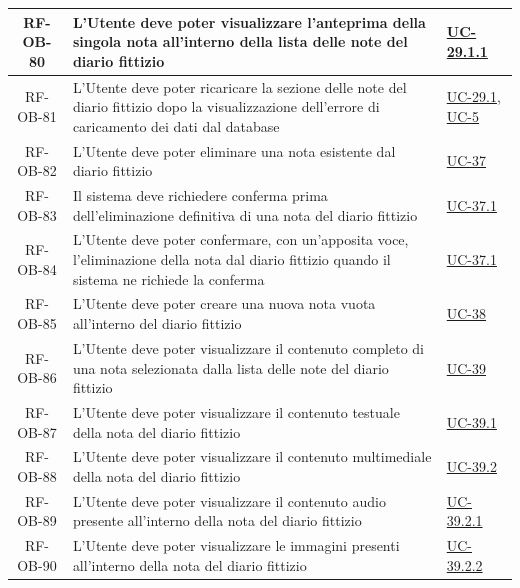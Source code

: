 \documentclass[a4paper,12pt]{article}
\begin{document}
\begin{center}
\begin{longtable}{|c|p{8.5cm}|>{\centering\arraybackslash}p{4cm}|}
RF-OB-80 & L'Utente deve poter visualizzare l'anteprima della singola nota all'interno della lista delle note del diario fittizio & \hyperref[subsec:UC-29.1.1]{UC-29.1.1} \\
\hline

RF-OB-81 & L'Utente deve poter ricaricare la sezione delle note del diario fittizio dopo la visualizzazione dell'errore di caricamento dei dati dal database & \hyperref[subsec:UC-29.1]{UC-29.1}, \hyperref[sec:UC-5]{UC-5} \\
\hline

RF-OB-82 & L'Utente deve poter eliminare una nota esistente dal diario fittizio & \hyperref[subsec:UC-37]{UC-37} \\
\hline

RF-OB-83 & Il sistema deve richiedere conferma prima dell'eliminazione definitiva di una nota del diario fittizio & \hyperref[subsec:UC-37.1]{UC-37.1} \\
\hline

RF-OB-84 & L'Utente deve poter confermare, con un'apposita voce, l'eliminazione della nota dal diario fittizio quando il sistema ne richiede la conferma & \hyperref[subsec:UC-37.1]{UC-37.1} \\
\hline

RF-OB-85 & L'Utente deve poter creare una nuova nota vuota all'interno del diario fittizio & \hyperref[subsec:UC-38]{UC-38} \\
\hline

RF-OB-86 & L'Utente deve poter visualizzare il contenuto completo di una nota selezionata dalla lista delle note del diario fittizio & \hyperref[subsec:UC-39]{UC-39} \\
\hline

RF-OB-87 & L'Utente deve poter visualizzare il contenuto testuale della nota del diario fittizio & \hyperref[subsec:UC-39.1]{UC-39.1} \\
\hline

RF-OB-88 & L'Utente deve poter visualizzare il contenuto multimediale della nota del diario fittizio & \hyperref[subsec:UC-39.2]{UC-39.2} \\
\hline

RF-OB-89 & L'Utente deve poter visualizzare il contenuto audio presente all'interno della nota del diario fittizio & \hyperref[subsec:UC-39.2.1]{UC-39.2.1} \\
\hline

RF-OB-90 & L'Utente deve poter visualizzare le immagini presenti all'interno della nota del diario fittizio & \hyperref[subsec:UC-39.2.2]{UC-39.2.2} \\
\hline


\end{longtable}
\end{center}
\end{document}
